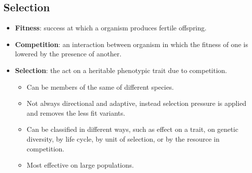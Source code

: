 \documentclass[12pt,a4paper]{article}
\begin{document}
\subsection{Selection}
\begin{itemize}
    \item \textbf{Fitness}: success at which a organism produces fertile offspring.
    \item \textbf{Competition}: an interaction between organism in which the fitness of one is lowered by the presence of another.
    \item \textbf{Selection}: the act on a heritable phenotypic trait due to competition.
    \begin{itemize}
        \item Can be members of the same of different species.
        \item Not always directional and adaptive, instead selection pressure is applied and removes the less fit variants.
        \item Can be classified in different ways, such as effect on a trait, on genetic diversity, by life cycle, by unit of selection, or by the resource in competition.
        \item Most effective on large populations.
    \end{itemize}

\end{itemize}
\end{document}
